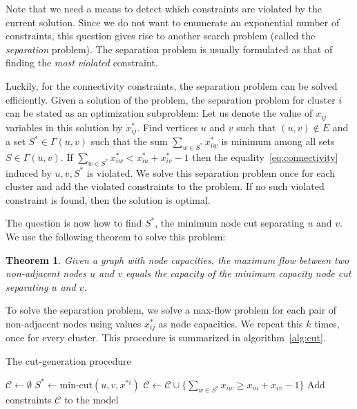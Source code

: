 \documentclass[conference,compsoc]{IEEEtran}
\newtheorem{theorem}{Theorem}
\begin{document}
Note that we need a means to detect which constraints are violated by
the current solution. Since we do not want to enumerate an exponential
number of constraints, this question gives rise to another search
problem (called the \emph{separation} problem). The separation problem
is usually formulated as that of finding the \emph{most violated}
constraint.

Luckily, for the connectivity constraints, the separation problem can be
solved efficiently. Given a solution of the problem, the
separation problem for cluster $i$ can be stated as an optimization subproblem: Let us denote the value of $x_{ij}$ variables in this solution by $x^*_{ij}$. Find vertices $u$ and $v$ such that $(u, v) \notin E$ and a set $S^* \in \Gamma(u, v)$ such that the sum $\sum_{w \in S^*} x_{iw}^*$ is
minimum among all sets $S \in \Gamma(u, v)$. If $\sum_{w \in S^*} x_{iw}^* < x^*_{iu} + x^*_{iv} - 1$ then the equality~\ref{eq:connectivity}
induced by $u, v, S^*$ is violated. We solve this separation problem
once for each cluster and add the violated constraints to the problem.
If no such violated constraint is found, then the solution is optimal.

The question is now how to find $S^*$, the minimum node cut separating
$u$ and $v$. We use the following theorem to solve this problem:

\begin{theorem}
Given a graph with node capacities, the maximum flow between
two non-adjacent nodes $u$ and $v$ equals the capacity of the minimum
capacity node cut separating $u$ and $v$.
\end{theorem}

To solve the separation problem, we solve a max-flow problem for each
pair of non-adjacent nodes using values $x^*_{ij}$ as node capacities. We repeat this $k$ times, once for every cluster. This procedure is summarized in algorithm~\ref{alg:cut}.

\begin{algorithm}
\centering
\caption{The cut-generation procedure}
\label{alg:cut}
\begin{algorithmic}[1]
\State $\mathcal{C} \gets \emptyset$
		\State $S^* \gets \text{min-cut}(u, v, x^{*i})$ 
			\State $\mathcal{C} \gets \mathcal{C} \cup \{\sum_{w \in S^*} x_{iw} \geq x_{iu} + x_{iv} - 1\}$ 
		\EndIf
	\EndFor
\EndFor
\State Add constraints $\mathcal{C}$ to the model
\end{algorithmic}
\end{algorithm}
\end{document}
